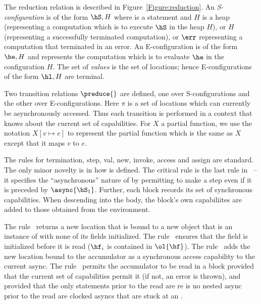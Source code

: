 
The reduction relation is described in
Figure~\ref{Figure:reduction}. An {\em S-configuration} is of the form
$\hS,H$ where \hS{} is a statement and $H$ is a heap (representing a
computation which is to execute $\hS$ in the heap $H$), or $H$
(representing a successfully terminated computation), or $\err$
representing a computation that terminated in an error. An
E-configuration is of the form $\he,H$ and represents the
computation which is to evaluate $\he$ in the configuration $H$. The
set of {\em values} is the set of locations; hence E-configurations of
the form $\hl,H$ are terminal.

Two transition relations $\preduce{}$ are defined, one over
S-configurations and the other over E-configurations. Here $\pi$ is a
set of locations which can currently be asynchronously accessed.  Thus
each transition is performed in a context that knows about the current
set of capabilities.  For $X$ a partial function, we use the notation
$X[v \mapsto e]$ to represent the partial function which is the same
as $X$ except that it maps $v$ to $e$.

The rules for termination, step, val, new, invoke, access and assign
are standard.  The only minor novelty is in how \hasync{} is
defined. The critical rule is the last rule in~ -- it
specifies the ``asynchronous'' nature of \hasync{} by permitting \hS{}
to make a step even if it is preceded by $\async{\hS_1}$. Further,
each block records its set of synchronous capabilities. When
descending into the body, the block's own capabiliites are added to
those obtained from the environment.

%
The rule~ returns a new location that is bound to a new
object that is an instance of \hC{} with none of its fields initialized.
%
The rule~ ensures that the field is initialized before it is
read ($\hf_i$ is contained in $\ol{\hf}$).
%
The rule~ adds the new location bound to the
accumulator as a synchronous access capability to the current async.
%
The rule~ permits the accumulator to be read in a
block provided that the current set of capabilities permit it (if not,
an error is thrown), and provided that the only statements prior to
the read are re is no nested async prior to the read are clocked
asyncs that are stuck at an \hadvance.

